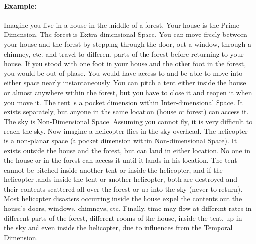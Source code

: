 \begin{multicols}{2}
\paragraph{Example:} Imagine you live in a house in the middle of a forest.  Your house is the Prime Dimension.  The forest is Extra-dimensional Space. You can move freely between your house and the forest by stepping through the door, out a window, through a chimney, etc. and travel to different parts of the forest before returning to your house.  If you stood with one foot in your house and the other foot in the forest, you would be out-of-phase.  You would have access to and be able to move into either space nearly instantaneously. You can pitch a tent either inside the house or almost anywhere within the forest, but you have to close it and reopen it when you move it.  The tent is a pocket dimension within Inter-dimensional Space.  It exists separately, but anyone in the same location (house or forest) can access it.  The sky is Non-Dimensional Space.  Assuming you cannot fly, it is very difficult to reach the sky.  Now imagine a helicopter flies in the sky overhead.  The helicopter is a non-planar space (a pocket dimension within Non-dimensional Space).  It exists outside the house and the forest, but can land in either location.  No one in the house or in the forest can access it until it lands in his location.  The tent cannot be pitched inside another tent or inside the helicopter, and if the helicopter lands inside the tent or another helicopter, both are destroyed and their contents scattered all over the forest or up into the sky (never to return).  Most helicopter disasters occurring inside the house expel the contents out the house's doors, windows, chimneys, etc.  Finally, time may flow at different rates in different parts of the forest, different rooms of the house, inside the tent, up in the sky and even inside the helicopter, due to influences from the Temporal Dimension.

\end{multicols}

